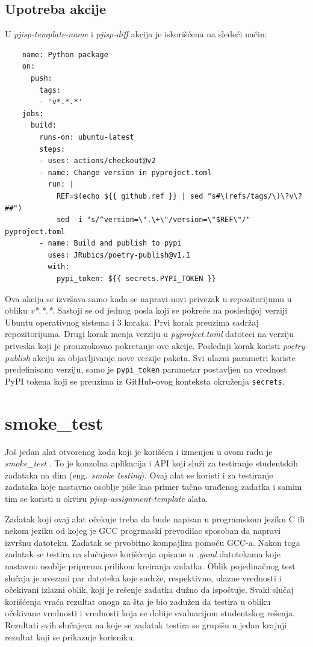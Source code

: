 \documentclass[12pt]{report}
\begin{document}
\subsection{Upotreba akcije}
U \textit{pjisp-template-name} i \textit{pjisp-diff} akcija je iskorišćena na sledeći način:
\begin{samepage}
    \begin{verbatim}
    name: Python package
    on:
      push:
        tags:
        - 'v*.*.*'
    jobs:
      build:
        runs-on: ubuntu-latest
        steps:
        - uses: actions/checkout@v2
        - name: Change version in pyproject.toml
          run: |
            REF=$(echo ${{ github.ref }} | sed "s#\(refs/tags/\)\?v\?##")
            sed -i "s/^version=\".\+\"/version=\"$REF\"/" pyproject.toml
        - name: Build and publish to pypi
          uses: JRubics/poetry-publish@v1.1
          with:
            pypi_token: ${{ secrets.PYPI_TOKEN }}
    \end{verbatim}
\end{samepage}

Ova akcija se izvršava samo kada se napravi novi privezak u repozitorijumu u obliku \textit{v*.*.*}. Sastoji se od jednog posla koji se pokreće na poslednjoj verziji Ubuntu operativnog sistema i 3 koraka. Prvi korak preuzima sadržaj repozitorijuma. Drugi korak menja verziju u \textit{pyproject.toml} datoteci na verziju priveska koji je prouzrokovao pokretanje ove akcije. Poslednji korak koristi \textit{poetry-publish} akciju za objavljivanje nove verzije paketa. Svi ulazni parametri koriste predefinisanu verziju, samo je \texttt{pypi\_token} parametar postavljen na vrednost PyPI tokena koji se preuzima iz GitHub-ovog konteksta okruženja \texttt{secrets}.

\section{smoke\_test}
Još jedan alat otvorenog koda koji je korišćen i izmenjen u ovom radu je \textit{smoke\_test} \cite{smoke-test}. To je konzolna aplikacija i API koji služi za testiranje studentskih zadataka na dim (eng.\ \textit{smoke testing}). Ovaj alat se koristi i za testiranje zadataka koje nastavno osoblje piše kao primer tačno urađenog zadatka i samim tim se koristi u okviru \textit{pjisp-assignment-template} alata.

Zadatak koji ovaj alat očekuje treba da bude napisan u programskom jeziku C ili nekom jeziku od kojeg je GCC progrmaski prevodilac sposoban da napravi izvršnu datoteku. Zadatak se prvobitno kompajlira pomoću GCC-a. Nakon toga zadatak se testira na slučajeve korišćenja opisane u \textit{.yaml} datotekama koje nastavno osoblje priprema prilikom kreiranja zadatka. Oblik pojedinačnog test slučaja je uvezani par datoteka koje sadrže, respektivno, ulazne vrednosti i očekivani izlazni oblik, koji je rešenje zadatka dužno da ispoštuje. Svaki slučaj korišćenja vraća rezultat onoga za šta je bio zadužen da testira u obliku očekivane vrednosti i vrednosti koja se dobije evaluacijom studentskog rešenja. Rezultati svih slučajeva na koje se zadatak testira se grupišu u jedan krajnji rezultat koji se prikazuje korisniku.
\end{document}
